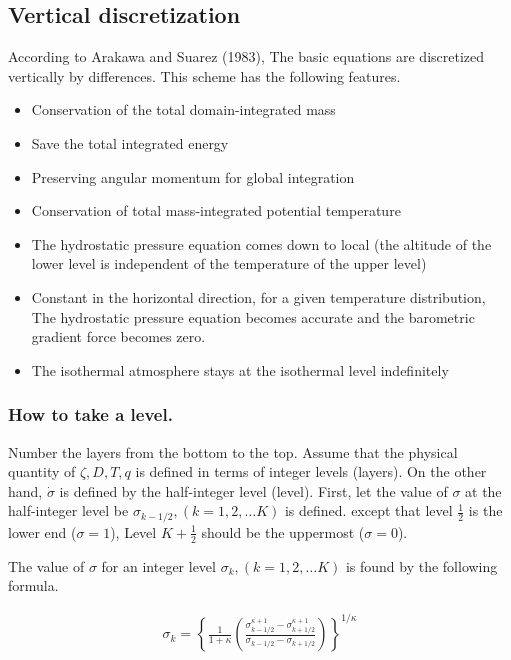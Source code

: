 \hypertarget{vertical-discretization}{%
\subsection{Vertical discretization}\label{vertical-discretization}}

According to Arakawa and Suarez (1983), The basic equations are
discretized vertically by differences. This scheme has the following
features.

\begin{itemize}
\item
  Conservation of the total domain-integrated mass
\item
  Save the total integrated energy
\item
  Preserving angular momentum for global integration
\item
  Conservation of total mass-integrated potential temperature
\item
  The hydrostatic pressure equation comes down to local (the altitude of
  the lower level is independent of the temperature of the upper level)
\item
  Constant in the horizontal direction, for a given temperature
  distribution, The hydrostatic pressure equation becomes accurate and
  the barometric gradient force becomes zero.
\item
  The isothermal atmosphere stays at the isothermal level indefinitely
\end{itemize}

\hypertarget{how-to-take-a-level.}{%
\subsubsection{How to take a level.}\label{how-to-take-a-level.}}

Number the layers from the bottom to the top. Assume that the physical
quantity of \(\zeta,D,T,q\) is defined in terms of integer levels
(layers). On the other hand, \(\dot{\sigma}\) is defined by the
half-integer level (level). First, let the value of \(\sigma\) at the
half-integer level be \(\sigma_{k-1/2}, (k=1,2,\ldots K)\) is defined.
except that level \(\frac{1}{2}\) is the lower end (\(\sigma=1\)), Level
\(K+\frac{1}{2}\) should be the uppermost (\(\sigma=0\)).

The value of \(\sigma\) for an integer level
\(\sigma_k, (k=1,2,\ldots K)\) is found by the following formula.

\begin{eqnarray}
 \sigma_k = \left\{ \frac{1}{1+\kappa}
                     \left( \frac{  \sigma^{\kappa +1}_{k-1/2}
                                  - \sigma^{\kappa +1}_{k+1/2}      }
                                  { \sigma_{k-1/2} - \sigma_{k+1/2} }
                     \right)
              \right\}^{1/\kappa}
\end{eqnarray}

